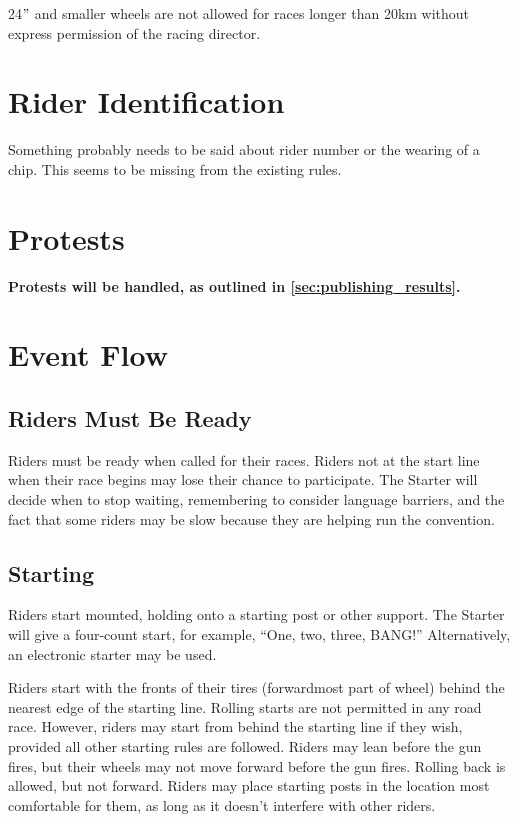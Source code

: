 24$"$ and smaller wheels are not allowed for races longer than 20km without express permission of the racing director.

\section{Rider Identification}

\begin{framed}
Something probably needs to be said about rider number or the wearing of a chip.  This seems to be missing from the existing rules.
\end{framed}

\section{Protests}

\textbf{Protests will be handled, as outlined in \ref{sec:publishing_results}.}

\section{Event Flow}

\subsection{Riders Must Be Ready}

Riders must be ready when called for their races.
Riders not at the start line when their race begins may lose their chance to participate.
The Starter will decide when to stop waiting, remembering to consider language barriers, and the fact that some riders may be slow because they are helping run the convention.

\subsection{Starting}

Riders start mounted, holding onto a starting post or other support.
The Starter will give a four-count start, for example, ``One, two, three, BANG!'' Alternatively, an electronic starter may be used.

Riders start with the fronts of their tires (forwardmost part of wheel) behind the nearest edge of the starting line.
Rolling starts are not permitted in any road race.
However, riders may start from behind the starting line if they wish, provided all other starting rules are followed.
Riders may lean before the gun fires, but their wheels may not move forward before the gun fires.
Rolling back is allowed, but not forward.
Riders may place starting posts in the location most comfortable for them, as long as it doesn't interfere with other riders.

